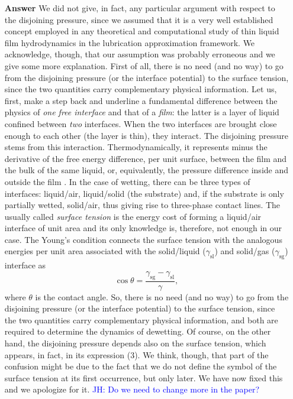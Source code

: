 \documentclass[12pt,english]{article}
\newcommand{\JH}[1]{\textcolor{blue}{JH: #1}}
\begin{document}
\begin{itemize}
\item[ \textbf{{Answer}}]
{
We did not give, in fact, any particular argument with respect to the disjoining pressure, since 
we assumed that it is a very well established concept employed in any theoretical and computational study of thin liquid film hydrodynamics in the lubrication approximation framework.
We acknowledge, though, that our assumption was probably erroneous and we give some more explanation. 
First of all, there is no need (and no way) to go from the disjoining pressure (or the interface potential) to the surface tension, since the two quantities carry complementary physical information. 
Let us, first, make a step back and underline a fundamental difference between the physics of {\it one free interface} and that of a {\it film}:
the latter is a layer of liquid confined between {\it two} interfaces. When the two interfaces are brought close enough to each other (the layer is thin), they interact.
The disjoining pressure stems from this interaction. Thermodynamically, it represents minus the derivative of the free energy difference, per unit surface, between 
the film and the bulk of the same liquid, or, equivalently, the pressure difference inside and outside the film 
\cite{Deryaguin1940,DeryaguinChuraev1978}.
In the case of wetting, there can be three types of interfaces: liquid/air, liquid/solid (the substrate) and, 
if the substrate is only partially wetted, solid/air, thus giving rise to three-phase contact lines. 
The usually called {\it surface tension} is the energy cost of forming a liquid/air interface of unit area and its only knowledge is, therefore, not enough in our case. 
The Young's condition \cite{Young1805,DeGennes1985} connects the surface tension with the analogous energies per unit
area associated with the solid/liquid ($\gamma_{\text{sl}}$) and solid/gas ($\gamma_{\text{sg}}$) interface as
\begin{equation}
\cos \theta = \frac{\gamma_{\text{sg}}-\gamma_{\text{sl}}}{\gamma},
\end{equation}
where $\theta$ is the contact angle.
So, there is no need (and no way) to go from the disjoining pressure (or the interface potential) to the surface tension, since the two quantities carry complementary physical information,
and both are required to determine the dynamics of dewetting.
Of course, on the other hand, the disjoining pressure depends also on the surface tension, which appears, in fact, in its expression (3). 
We think, though, that part of the confusion might be due to the fact that we do not define the symbol of the surface tension at its first occurrence, but only later. 
We have now fixed this and we apologize for it.
\JH{Do we need to change more in the paper?}
}


\end{itemize}
\end{document}
